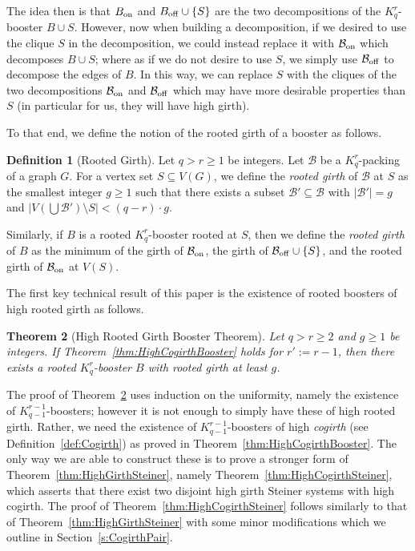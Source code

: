 \documentclass[11pt]{article}
\newcommand{\mc}[1]{\mathcal{#1}}
\newcounter{i}
\theoremstyle{plain}
\newtheorem{thm}{Theorem}[section]
\theoremstyle{plain} %
\theoremstyle{definition}
\newtheorem{definition}[thm]{Definition}
\newcommand{\LP}[1]{\textcolor{Red}{ $\blacktriangleright$\ {\sf LP: #1}\
  $\blacktriangleleft$ }}
\begin{document}
The idea then is that $B_{\rm on}$ and $B_{\rm off}\cup \{S\}$ are the two decompositions of the $K_q^r$-booster $B\cup S$. However, now when building a decomposition, if we desired to use the clique $S$ in the decomposition, we could instead replace it with $\mathcal{B}_{{\rm on}}$ which decomposes $B\cup S$; where as if we do not desire to use $S$, we simply use $\mc{B}_{\rm off}$ to decompose the edges of $B$. In this way, we can replace $S$ with the cliques of the two decompositions $\mc{B}_{\rm on}$ and $\mc{B}_{\rm off}$ which may have more desirable properties than $S$ (in particular for us, they will have high girth).

To that end, we define the notion of the rooted girth of a booster as follows.

\begin{definition}[Rooted Girth]
Let $q > r\ge 1$ be integers. Let $\mathcal{B}$ be a $K_q^r$-packing of a graph $G$. For a vertex set $S\subseteq V(G)$, we define the \emph{rooted girth} of $\mathcal{B}$ at $S$ as the smallest integer $g\ge 1$ such that there exists a subset $\mathcal{B}'\subseteq \mathcal{B}$  with $|\mathcal{B}'|=g$ and $|V(\bigcup \mathcal{B}')\setminus S| < (q-r)\cdot g$.  

Similarly, if $B$ is a rooted $K_q^r$-booster rooted at $S$, then we define the \emph{rooted girth} of $B$ as the minimum of the girth of $\mathcal{B}_{{\rm on}}$, the girth of $\mathcal{B}_{{\rm off}}\cup \{S\}$, and the rooted girth of $\mathcal{B}_{{\rm on}}$ at $V(S)$.
\end{definition}

The first key technical result of this paper is the existence of rooted boosters of high rooted girth as follows.

\begin{thm}[High Rooted Girth Booster Theorem]\label{thm:HighRootedGirthBooster}
Let $q > r\ge 2$ and $g\ge 1$ be integers. If Theorem~\ref{thm:HighCogirthBooster} holds for $r':=r-1$, then there exists a rooted $K_q^r$-booster $B$ with rooted girth at least $g$. 
\end{thm}

 The proof of Theorem~\ref{thm:HighRootedGirthBooster} uses induction on the uniformity, namely the existence of $K_{q-1}^{r-1}$-boosters; however it is not enough to simply have these of high rooted girth. Rather, we need the existence of $K_{q-1}^{r-1}$-boosters of high \emph{cogirth} (see Definition~\ref{def:Cogirth}) as proved in Theorem~\ref{thm:HighCogirthBooster}. The only way we are able to construct these is to prove a stronger form of Theorem~\ref{thm:HighGirthSteiner}, namely Theorem~\ref{thm:HighCogirthSteiner}, which asserts that there exist two disjoint high girth Steiner systems with high cogirth. The proof of Theorem~\ref{thm:HighCogirthSteiner} follows similarly to that of Theorem~\ref{thm:HighGirthSteiner} with some minor modifications which we outline in Section~\ref{s:CogirthPair}.
\end{document}
